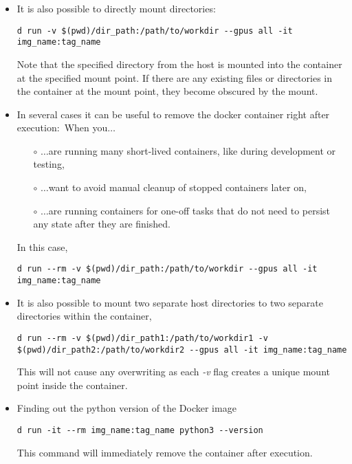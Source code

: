 \documentclass[12pt, a4paper]{article}
\numberwithin{equation}{section}
\theoremstyle{definition}
\theoremstyle{definition}
\begin{document}
\begin{itemize}
			\item It is also possible to directly mount directories:
			
			\begin{lstlisting}[style=mystylebash, label=alg:docker_run__mount_dir, xleftmargin=\parindent]
				d run -v $(pwd)/dir_path:/path/to/workdir --gpus all -it img_name:tag_name
			\end{lstlisting}
		
			Note that the specified directory from the host is mounted into the container at the specified mount point. If there are any existing files or directories in the container at the mount point, they become obscured by the mount.
			
			\item In several cases it can be useful to remove the docker container right after execution:~When you$\dots$
			\begin{itemize}
				\item[$\circ$] $\dots$are running many short-lived containers, like during development or testing,
				\item[$\circ$] $\dots$want to avoid manual cleanup of stopped containers later on,
				\item[$\circ$] $\dots$are running containers for one-off tasks that do not need to persist any state after they are finished.
			\end{itemize}
			
			In this case, 
			
			\begin{lstlisting}[style=mystylebash, label=alg:docker_run__mount_dir_rm, xleftmargin=\parindent]
				d run --rm -v $(pwd)/dir_path:/path/to/workdir --gpus all -it img_name:tag_name
			\end{lstlisting}

			\item It is also possible to mount two separate host directories to two separate directories within the container,
			
			\begin{lstlisting}[style=mystylebash, label=alg:docker_run__mount_sev_dir_rm, xleftmargin=\parindent]
				d run --rm -v $(pwd)/dir_path1:/path/to/workdir1 -v $(pwd)/dir_path2:/path/to/workdir2 --gpus all -it img_name:tag_name
			\end{lstlisting}
			
			This will not cause any overwriting as each \textit{-v} flag creates a unique mount point inside the container. 
			
			\item Finding out the python version of the Docker image
			
			\begin{lstlisting}[style=mystylebash, label=alg:docker__python_version, xleftmargin=\parindent]
				d run -it --rm img_name:tag_name python3 --version
			\end{lstlisting}
			
			This command will immediately remove the container after execution.
			
		\end{itemize}
\end{document}
